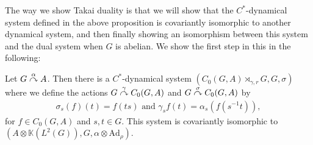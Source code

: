 The way we show Takai duality is that we will show that the $C^*$-dynamical system defined in the above proposition is covariantly isomorphic to another dynamical system, and then finally showing an isomorphism between this system and the dual system when $G$ is abelian. We show the first step in this in the following:
\begin{theorem}
Let $G \stackrel{\alpha}{\curvearrowright} A$. Then there is a $C^*$-dynamical system $(C_0(G,A) \rtimes_{\gamma,r} G , G, \sigma )$ where we define the actions $G \stackrel{\gamma}{\curvearrowright} C_0(G,A)$ and $G \stackrel{\sigma}{\curvearrowright} C_0(G,A)$ by
\begin{align*}
	\sigma_s (f)(t) = f(ts) \text{ and } \gamma_s f(t) = \alpha_s(f(s^{-1}t)),
\end{align*}
for $f \in C_0(G,A)$ and $s,t \in G$. This system is covariantly isomorphic to $(A \otimes \mathbb{K}(L^2(G)), G , \alpha \otimes \mathrm{Ad}_\rho)$.
\label{takai:compactiso}
\end{theorem}
